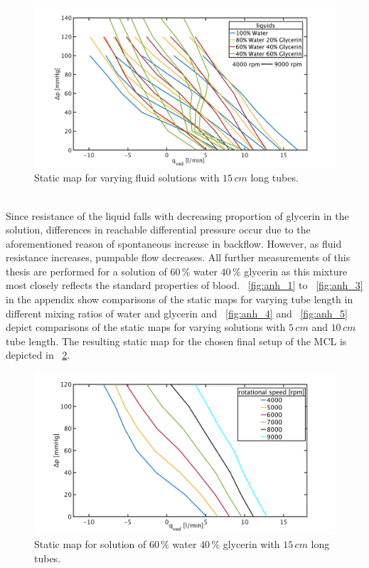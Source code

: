 \begin{figure}[ht]
  \centering
  \includegraphics[width=\textwidth]{images/chapt_4/long_liquid_change_new.pdf}
  \caption[Static map for varying fluid solution with $15\,cm$ long tubes]{Static map for varying fluid solutions with $15\,cm$ long tubes.}
  \label{fig:long_tubes}
\end{figure}
 \\Since resistance of the liquid falls with decreasing proportion of glycerin in the solution, differences in reachable differential pressure occur due to the aforementioned reason of spontaneous increase in backflow. However, as fluid resistance increases, pumpable flow decreases. All further measurements of this thesis are performed for a solution of $60\, \%$ water $40\,\%$ glycerin as this mixture most closely reflects the standard properties of blood.
\figurename~\ref{fig:anh_1} to \figurename~\ref{fig:anh_3} in the appendix show comparisons of the static maps for varying tube length in different mixing ratios of water and glycerin and \figurename~\ref{fig:anh_4} and \figurename~\ref{fig:anh_5} depict comparisons of the static maps for varying  solutions with $5\, cm$ and $10\, cm$ tube length.
The resulting static map for the chosen final setup of the MCL is depicted in \figurename~\ref{fig:60w40glong}.

\begin{figure}[ht!]
  \centering
  \includegraphics[width=\textwidth]{images/chapt_4/60w40g_long.pdf}
  \caption[Static map for solution of $60\, \%$ water $40\, \%$ glycerin with $15\,cm$ long tubes]{Static map for solution of $60\, \%$ water $40\, \%$ glycerin with $15\,cm$ long tubes.}
  \label{fig:60w40glong}
\end{figure}


